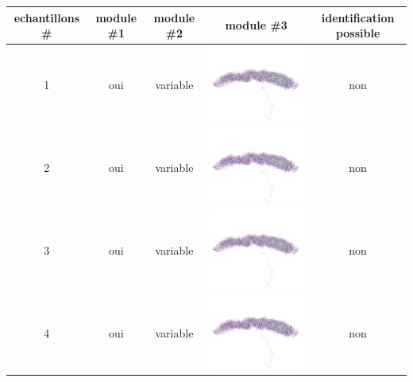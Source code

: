 \begin{table}[h]
\centering
\begin{tabular}{|c|c|c|c|c|}
\hline
echantillons \# & module \#1 & module \#2 & module \#3 & identification possible\\
\hline
1 & oui & variable & \includegraphics[scale=0.25]{images/test1.png}  & non \\
\hline
2 & oui & variable & \includegraphics[scale=0.25]{images/test1.png}  & non \\
\hline
3 & oui & variable & \includegraphics[scale=0.25]{images/test1.png}  & non \\
\hline
4 & oui & variable & \includegraphics[scale=0.25]{images/test1.png}  & non \\

\end{tabular}
\end{table}
